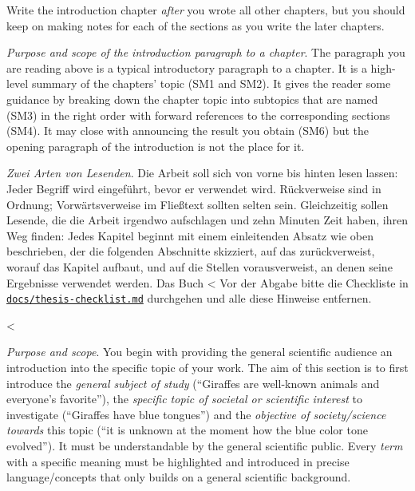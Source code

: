 {{{Write the introduction chapter \emph{after} you wrote all other chapters, but you should keep on making notes for each of the sections as you write the later chapters.

\emph{Purpose and scope of the introduction paragraph to a chapter}.
The paragraph you are reading above is a typical introductory paragraph to a chapter.
It is a high-level summary of the chapters' topic (SM1 and SM2).
It gives the reader some guidance by breaking down the chapter topic into subtopics that are named (SM3) in the right order with forward references to the corresponding sections (SM4).
It may close with announcing the result you obtain (SM6) but the opening paragraph of the introduction is not the place for it.

\emph{Zwei Arten von Lesenden}.
Die Arbeit soll sich von vorne bis hinten lesen lassen: Jeder Begriff wird eingeführt, bevor er verwendet wird.
Rückverweise sind in Ordnung; Vorwärtsverweise im Fließtext sollten selten sein.
Gleichzeitig sollen Lesende, die die Arbeit irgendwo aufschlagen und zehn Minuten Zeit haben, ihren Weg finden:
Jedes Kapitel beginnt mit einem einleitenden Absatz wie oben beschrieben, der die folgenden Abschnitte skizziert, auf das zurückverweist, worauf das Kapitel aufbaut, und auf die Stellen vorausverweist, an denen seine Ergebnisse verwendet werden.
Das Buch <%
Vor der Abgabe bitte die Checkliste in \href{https://github.com/latextemplates/scientific-thesis-template/blob/main/docs/thesis-checklist.md}{\texttt{docs/thesis-checklist.md}} durchgehen und alle diese Hinweise entfernen.

<%

\emph{Purpose and scope}.
You begin with providing the general scientific audience an introduction into the specific topic of your work.
The aim of this section is to first introduce the \emph{general subject of study} (``Giraffes are well-known animals and everyone's favorite''), the \emph{specific topic of societal or scientific interest} to investigate (``Giraffes have blue tongues'') and the \emph{objective of society/science towards} this topic (``it is unknown at the moment how the blue color tone evolved'').
It must be understandable by the general scientific public.
Every \emph{term} with a specific meaning must be highlighted and introduced in precise language/concepts that only builds on a general scientific background.

}}}
